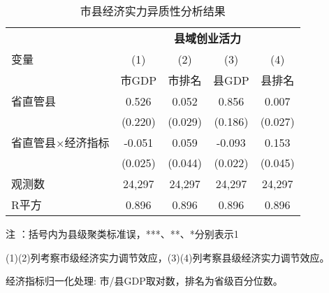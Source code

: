 \begin{table}[htbp]
\footnotesize
\centering
\caption{市县经济实力异质性分析结果}\label{tab:hetero_eco}
\begin{threeparttable}
\begin{tabular}{lcccc}
\toprule
 & \multicolumn{4}{c}{\textbf{县域创业活力}} \\
\cmidrule(lr){2-5}
变量 & (1) & (2) & (3) & (4) \\
 & 市GDP & 市排名 & 县GDP & 县排名 \\
\midrule
省直管县 & 0.526\tnote{**} & 0.052 & 0.856\tnote{***} & 0.007 \\
 & (0.220) & (0.029) & (0.186) & (0.027) \\
省直管县$\times$经济指标 & -0.051\tnote{**} & 0.059 & -0.093\tnote{***} & 0.153\tnote{***} \\
 & (0.025) & (0.044) & (0.022) & (0.045) \\
\midrule
观测数 & 24,297 & 24,297 & 24,297 & 24,297 \\
R平方 & 0.896 & 0.896 & 0.896 & 0.896 \\
\bottomrule
\end{tabular}

\begin{tablenotes}
\scriptsize
\item[注]：括号内为县级聚类标准误，***、**、*分别表示1%
\item (1)(2)列考察市级经济实力调节效应，(3)(4)列考察县级经济实力调节效应。
\item 经济指标归一化处理: 市/县GDP取对数，排名为省级百分位数。
\end{tablenotes}
\end{threeparttable}
\end{table}
